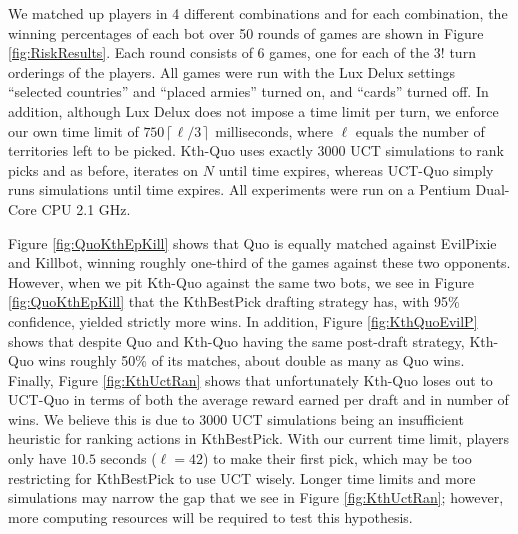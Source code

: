 \documentclass[letterpaper]{article}
\numberwithin{equation}{section}
\numberwithin{theorem}{section}
\numberwithin{lemma}{section}
\numberwithin{df}{section}
\begin{document}
We matched up players in 4 different combinations and for each combination, the winning percentages of each bot over 50 rounds of games are shown in Figure \ref{fig:RiskResults}.  Each round consists of 6 games, one for each of the $3!$ turn orderings of the players.  All games were run with the Lux Delux settings ``selected countries'' and ``placed armies'' turned on, and ``cards'' turned off.  In addition, although Lux Delux does not impose a time limit per turn, we enforce our own time limit of $750 \left \lceil \ell / 3 \right \rceil$ milliseconds, where $\ell$ equals the number of territories left to be picked.  Kth-Quo uses exactly 3000 UCT simulations to rank picks and as before, iterates on $N$ until time expires, whereas UCT-Quo simply runs simulations until time expires.  All experiments were run on a Pentium Dual-Core CPU 2.1 GHz.  

Figure \ref{fig:QuoKthEpKill} shows that Quo is equally matched against EvilPixie and Killbot, winning roughly one-third of the games against these two opponents.  However, when we pit Kth-Quo against the same two bots, we see in Figure \ref{fig:QuoKthEpKill} that the KthBestPick drafting strategy has, with 95\% confidence, yielded strictly more wins.  In addition, Figure \ref{fig:KthQuoEvilP} shows that despite Quo and Kth-Quo having the same post-draft strategy, Kth-Quo wins roughly 50\% of its matches, about double as many as Quo wins.  Finally, Figure \ref{fig:KthUctRan} shows that unfortunately Kth-Quo loses out to UCT-Quo in terms of both the average reward earned per draft and in number of wins.  We believe this is due to 3000 UCT simulations being an insufficient heuristic for ranking actions in KthBestPick.  With our current time limit, players only have $10.5$ seconds ($\ell = 42$) to make their first pick, which may be too restricting for KthBestPick to use UCT wisely.  Longer time limits and more simulations may narrow the gap that we see in Figure \ref{fig:KthUctRan}; however, more computing resources will be required to test this hypothesis.

\end{document}
